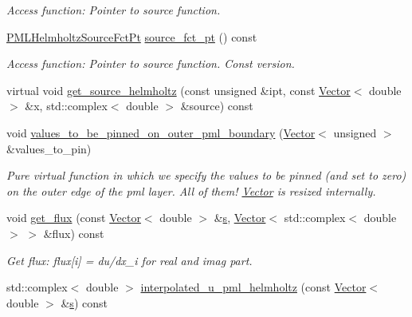 \begin{DoxyCompactItemize}
\begin{DoxyCompactList}\small\item\em Access function\+: Pointer to source function. \end{DoxyCompactList}\item 
\hyperlink{classoomph_1_1PMLHelmholtzEquationsBase_abf57477abc2672cd680742e17721a07f}{P\+M\+L\+Helmholtz\+Source\+Fct\+Pt} \hyperlink{classoomph_1_1PMLHelmholtzEquationsBase_a185efe8aa7459ee8e6241eb94eb6e6f7}{source\+\_\+fct\+\_\+pt} () const
\begin{DoxyCompactList}\small\item\em Access function\+: Pointer to source function. Const version. \end{DoxyCompactList}\item 
virtual void \hyperlink{classoomph_1_1PMLHelmholtzEquationsBase_adc5a0db474b2a7a857e2d5724f5293f5}{get\+\_\+source\+\_\+helmholtz} (const unsigned \&ipt, const \hyperlink{classoomph_1_1Vector}{Vector}$<$ double $>$ \&x, std\+::complex$<$ double $>$ \&source) const
\item 
void \hyperlink{classoomph_1_1PMLHelmholtzEquationsBase_a5fc803f8c95512606666a7fe0dbb6f85}{values\+\_\+to\+\_\+be\+\_\+pinned\+\_\+on\+\_\+outer\+\_\+pml\+\_\+boundary} (\hyperlink{classoomph_1_1Vector}{Vector}$<$ unsigned $>$ \&values\+\_\+to\+\_\+pin)
\begin{DoxyCompactList}\small\item\em Pure virtual function in which we specify the values to be pinned (and set to zero) on the outer edge of the pml layer. All of them! \hyperlink{classoomph_1_1Vector}{Vector} is resized internally. \end{DoxyCompactList}\item 
void \hyperlink{classoomph_1_1PMLHelmholtzEquationsBase_a255447874c4f8477e5358a253462bb62}{get\+\_\+flux} (const \hyperlink{classoomph_1_1Vector}{Vector}$<$ double $>$ \&\hyperlink{cfortran_8h_ab7123126e4885ef647dd9c6e3807a21c}{s}, \hyperlink{classoomph_1_1Vector}{Vector}$<$ std\+::complex$<$ double $>$ $>$ \&flux) const
\begin{DoxyCompactList}\small\item\em Get flux\+: flux\mbox{[}i\mbox{]} = du/dx\+\_\+i for real and imag part. \end{DoxyCompactList}\item 
std\+::complex$<$ double $>$ \hyperlink{classoomph_1_1PMLHelmholtzEquationsBase_aa9583162d7aa5422957ecff9ab189f3b}{interpolated\+\_\+u\+\_\+pml\+\_\+helmholtz} (const \hyperlink{classoomph_1_1Vector}{Vector}$<$ double $>$ \&\hyperlink{cfortran_8h_ab7123126e4885ef647dd9c6e3807a21c}{s}) const

\end{DoxyCompactItemize}
